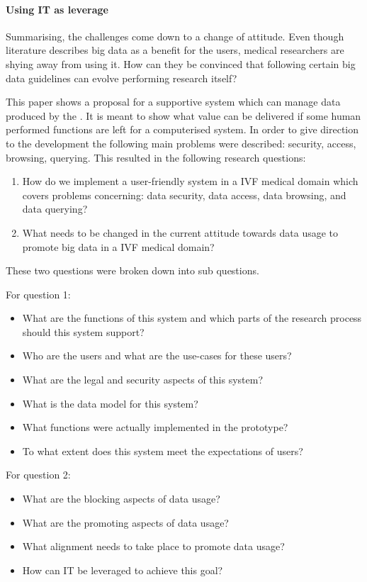 \paragraph{Using IT as leverage}
Summarising, the challenges come down to a change of attitude.
Even though literature describes big data as a benefit for the users, medical researchers are shying away from using it.
How can they be convinced that following certain big data guidelines can evolve performing research itself?

This paper shows a proposal for a supportive system which can manage data produced by the \project{}.
It is meant to show what value can be delivered if some human performed functions are left for a computerised system.
In order to give direction to the development the following main problems were described: security, access, browsing, querying.
This resulted in the following research questions:

\begin{enumerate}
	\item How do we implement a user-friendly system in a IVF medical domain which covers problems concerning: data security, data access, data browsing, and data querying?
	\item What needs to be changed in the current attitude towards data usage to promote big data in a IVF medical domain?
\end{enumerate}

These two questions were broken down into sub questions. 

For question 1:
\begin{itemize}
	\item What are the functions of this system and which parts of the research process should this system support?
	\item Who are the users and what are the use-cases for these users?
	\item What are the legal and security aspects of this system?
	\item What is the data model for this system?
	\item What functions were actually implemented in the prototype? 
	\item To what extent does this system meet the expectations of users?
\end{itemize}

For question 2:
\begin{itemize}
	\item What are the blocking aspects of data usage?
	\item What are the promoting aspects of data usage?
	\item What alignment needs to take place to promote data usage?
	\item How can IT be leveraged to achieve this goal?
\end{itemize}